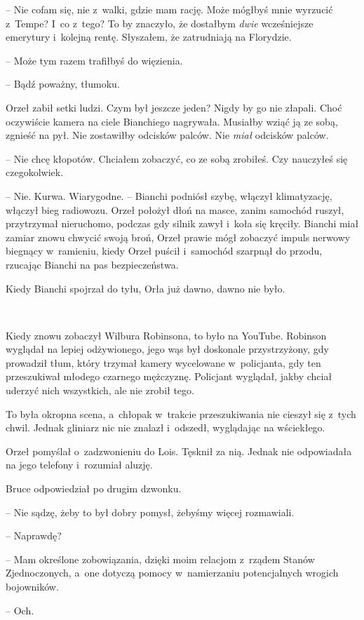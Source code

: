 \documentclass[oneside,polish,11pt,sfheadings]{mwbk}
\begin{document}
-- Nie cofam się, nie z~walki, gdzie mam rację. Może mógłbyś mnie
wyrzucić z~Tempe? I~co z~tego? To by znaczyło, że dostałbym \textit{dwie}
wcześniejsze emerytury i~kolejną rentę. Słyszałem, że zatrudniają na
Florydzie.

-- Może tym razem trafiłbyś do więzienia.

-- Bądź poważny, tłumoku.

Orzeł zabił setki ludzi. Czym był jeszcze jeden? Nigdy by go nie
złapali. Choć oczywiście kamera na ciele Bianchiego nagrywała. Musiałby
wziąć ją ze sobą, zgnieść na pył. Nie zostawiłby odcisków palców. Nie
\textit{miał} odcisków palców.

-- Nie chcę kłopotów. Chciałem zobaczyć, co ze sobą zrobiłeś. Czy
nauczyłeś się czegokolwiek.

-- Nie. Kurwa. Wiarygodne. -- Bianchi podniósł szybę, włączył klimatyzację,
włączył bieg radiowozu. Orzeł położył dłoń na masce, zanim samochód
ruszył, przytrzymał nieruchomo, podczas gdy silnik zawył i~koła się
kręciły. Bianchi miał zamiar znowu chwycić swoją broń, Orzeł prawie
mógł zobaczyć impuls nerwowy biegnący w~ramieniu, kiedy Orzeł puścił i~samochód szarpnął do przodu, rzucając Bianchi na pas bezpieczeństwa.

Kiedy Bianchi spojrzał do tyłu, Orła już dawno, dawno nie było.

~

Kiedy znowu zobaczył Wilbura Robinsona, to było na YouTube. Robinson
wyglądał na lepiej odżywionego, jego wąs był doskonale przystrzyżony,
gdy prowadził tłum, który trzymał kamery wycelowane w~policjanta, gdy
ten przeszukiwał młodego czarnego mężczyznę. Policjant wyglądał, jakby
chciał uderzyć nich wszystkich, ale nie zrobił tego.

To była okropna scena, a~chłopak w~trakcie przeszukiwania nie cieszył
się z~tych chwil. Jednak gliniarz nic nie znalazł i~odszedł, wyglądając
na wściekłego.

Orzeł pomyślał o~zadzwonieniu do Lois. Tęsknił za nią. Jednak nie
odpowiadała na jego telefony i~rozumiał aluzję.

Bruce odpowiedział po drugim dzwonku. 

-- Nie sądzę, żeby to był dobry
pomysł, żebyśmy więcej rozmawiali.

-- Naprawdę?

-- Mam określone zobowiązania, dzięki moim relacjom z~rządem Stanów
Zjednoczonych, a~one dotyczą pomocy w~namierzaniu potencjalnych wrogich
bojowników.

-- Och.
\end{document}
